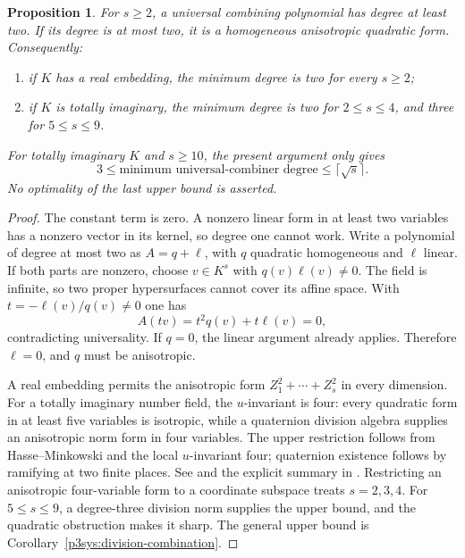 \documentclass[11pt]{article}
\newtheorem{proposition}[theorem]{Proposition}
\theoremstyle{definition}
\begin{document}
\begin{proposition}\label{p3sys:quadratic-combiner-optimality}
For $s\ge2$, a universal combining polynomial has degree at
least two.  If its degree is at most two, it is a homogeneous
anisotropic quadratic form.  Consequently:
\begin{enumerate}
\item if $K$ has a real embedding, the minimum degree is two
for every $s\ge2$;
\item if $K$ is totally imaginary, the minimum degree is two
for $2\le s\le4$, and three for $5\le s\le9$.
\end{enumerate}
For totally imaginary $K$ and $s\ge10$, the present argument
only gives
\[
 3\le\text{minimum universal-combiner degree}
                         \le\lceil\sqrt{s}\rceil.
\]
No optimality of the last upper bound is asserted.
\end{proposition}
\begin{proof}
The constant term is zero.  A nonzero linear form in at least
two variables has a nonzero vector in its kernel, so degree one
cannot work.  Write a polynomial of degree at most two as
$A=q+\ell$, with $q$ quadratic homogeneous and $\ell$ linear.
If both parts are nonzero, choose $v\in K^s$ with
$q(v)\ell(v)\ne0$.  The field is infinite, so two proper
hypersurfaces cannot cover its affine space.  With
$t=-\ell(v)/q(v)\ne0$ one has
\[
                          A(tv)=t^2q(v)+t\ell(v)=0,
\]
contradicting universality.  If $q=0$, the linear argument
already applies.  Therefore $\ell=0$, and $q$ must be
anisotropic.

A real embedding permits the anisotropic form
$Z_1^2+\cdots+Z_s^2$ in every dimension.  For a totally
imaginary number field, the $u$-invariant is four: every
quadratic form in at least five variables is isotropic, while
a quaternion division algebra supplies an anisotropic norm
form in four variables.  The upper restriction follows from
Hasse--Minkowski and the local $u$-invariant four; quaternion
existence follows by ramifying at two finite places.  See
\cite[Theorems~14.6.1 and 14.6.9]{Voight2021} and the explicit
summary in \cite[Section~5.1]{p3sysMerkurjevParimala2025}.
Restricting an anisotropic four-variable form to a coordinate
subspace treats $s=2,3,4$.  For $5\le s\le9$, a degree-three
division norm supplies the upper bound, and the quadratic
obstruction makes it sharp.  The general upper bound is
Corollary~\ref{p3sys:division-combination}.
\end{proof}
\end{document}
